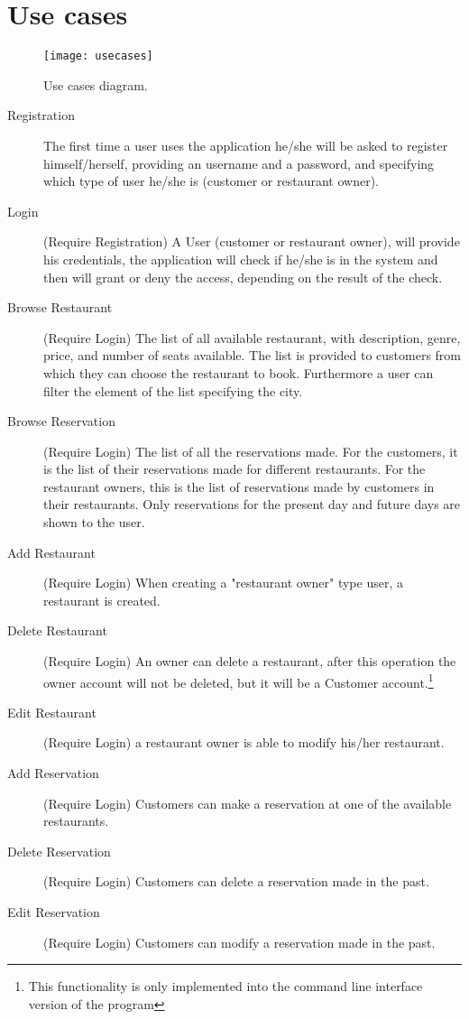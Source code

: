 \section{Use cases}

\begin{figure}[ht]
	\texttt{[image: usecases]}
	\caption{Use cases diagram.}
	\label{fig:usecases}
\end{figure}

\begin{description}
	\item[Registration] The first time a user uses the application  he/she
		will be asked to register himself/herself, providing an username
		and a password, and specifying which type of user he/she is
		(customer or restaurant owner).
	\item[Login] (Require Registration) A User (customer or restaurant
		owner), will provide his credentials, the application will check
		if he/she is in the system and then will grant or deny the
		access, depending on the result of the check.
	\item[Browse Restaurant] (Require Login) The list of all available
		restaurant, with description, genre, price, and number of seats
		available. The list is provided to customers from which they
		can choose the restaurant to book. Furthermore a user can filter
		the element of the list specifying the city.
	\item[Browse Reservation] (Require Login) The list of all the
		reservations made. For the customers, it is the list of their
		reservations made for different restaurants. For the restaurant
		owners, this is the list of reservations made by customers in
		their restaurants. Only reservations for the present day and
		future days are shown to the user.
	\item[Add Restaurant] (Require Login) When creating a "restaurant owner"
		type user, a restaurant is created.
	\item [Delete Restaurant] (Require Login) An owner can delete a
		restaurant, after this operation the owner account will not be
		deleted, but it will be a Customer account.\footnote{This
		functionality is only implemented into the command line
		interface version of the program}
	\item[Edit Restaurant] (Require Login) a restaurant owner is able to
		modify his/her restaurant.
	\item[Add Reservation] (Require Login) Customers can make a reservation
		at one of the available restaurants.
	\item[Delete Reservation] (Require Login) Customers can delete a
		reservation made in the past.
	\item[Edit Reservation] (Require Login) Customers can modify a
		reservation made in the past.
\end{description}
